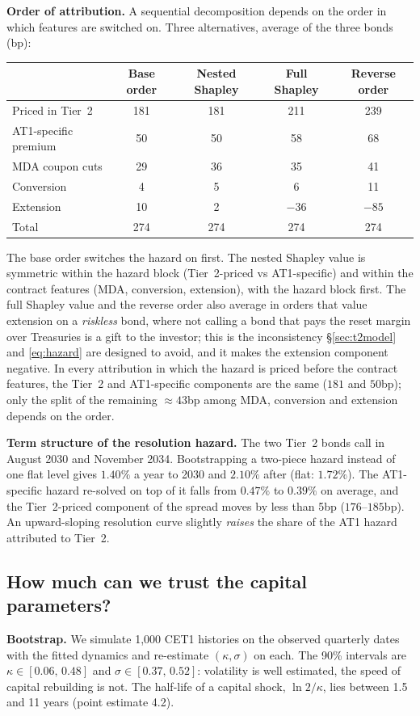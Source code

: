 \documentclass[11pt]{article}
\newcommand{\1}{\mathbf{1}}
\begin{document}
\textbf{Order of attribution.} A sequential decomposition depends on the order
in which features are switched on. Three alternatives, average of the three bonds
(bp):
\begin{center}
\begin{tabular}{lcccc}
\toprule
 & Base order & Nested Shapley & Full Shapley & Reverse order \\
\midrule
Priced in Tier~2 & 181 & 181 & 211 & 239 \\
AT1-specific premium & 50 & 50 & 58 & 68 \\
MDA coupon cuts & 29 & 36 & 35 & 41 \\
Conversion & 4 & 5 & 6 & 11 \\
Extension & 10 & 2 & $-36$ & $-85$ \\
\midrule
Total & 274 & 274 & 274 & 274 \\
\bottomrule
\end{tabular}
\end{center}
The base order switches the hazard on first. The nested Shapley value is
symmetric within the hazard block (Tier~2-priced vs AT1-specific) and within the
contract features (MDA, conversion, extension), with the hazard block first.
The full Shapley value and the reverse order also average in orders that value
extension on a \emph{riskless} bond, where not calling a bond that pays the
reset margin over Treasuries is a gift to the investor; this is the
inconsistency \S\ref{sec:t2model} and \eqref{eq:hazard} are designed to avoid,
and it makes the extension component negative. In every attribution in which the
hazard is priced before the contract features, the Tier~2 and AT1-specific
components are the same ($181$ and $50$bp); only the split of the remaining
$\approx43$bp among MDA, conversion and extension depends on the order.

\textbf{Term structure of the resolution hazard.} The two Tier~2 bonds call in
August 2030 and November 2034. Bootstrapping a two-piece hazard instead of one
flat level gives $1.40\%$ a year to 2030 and $2.10\%$ after (flat: $1.72\%$). The
AT1-specific hazard re-solved on top of it falls from $0.47\%$ to $0.39\%$ on
average, and the Tier~2-priced component of the spread moves by less than 5bp
($176$--$185$bp). An upward-sloping resolution curve slightly \emph{raises} the
share of the AT1 hazard attributed to Tier~2.

\subsection{How much can we trust the capital parameters?}\label{sec:uncert}
\textbf{Bootstrap.} We simulate 1{,}000 CET1 histories on the observed quarterly
dates with the fitted dynamics and re-estimate $(\kappa,\sigma)$ on each. The 90\%
intervals are $\kappa\in[0.06,\,0.48]$ and $\sigma\in[0.37,\,0.52]$: volatility
is well estimated, the speed of capital rebuilding is not. The half-life of a
capital shock, $\ln 2/\kappa$, lies between 1.5 and 11 years (point estimate 4.2).
\end{document}
